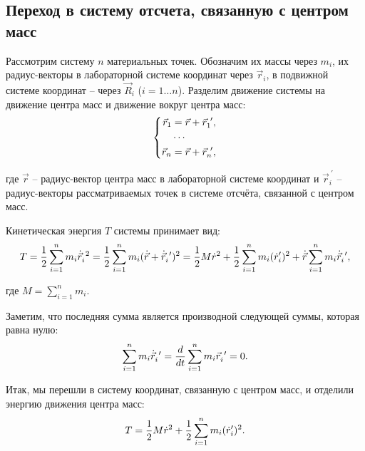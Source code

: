 \documentclass[12pt]{article}
\begin{document}
\subsection{Переход в систему отсчета, связанную с центром масс}

\hspace{0.35cm} Рассмотрим систему $n$ материальных точек. Обозначим их массы через $m_i$, их радиус-векторы в лабораторной системе координат через $\vec{r}_i$, в подвижной системе координат -- через $\vec{R}_i$ ($i = 1 \dots n$). Разделим движение системы на движение центра масс и движение вокруг центра масс:
\vspace*{-0.1cm}
\begin{gather}
\left\{
\begin{aligned}
\vec{r}_1 &= \vec{r} + \vec{r}_1^{\ \prime}, \\
&\cdots \\
\vec{r}_n &= \vec{r} + \vec{r}_n^{\ \prime},
\end{aligned}
\right. \notag
\end{gather}

\hspace*{-0.75cm} где $\vec{r}$ -- радиус-вектор центра масс в лабораторной системе координат и $\vec{r}_i^{\ \prime}$ -- радиус-векторы рассматриваемых точек в системе отсчёта, связанной с центром масс.

Кинетическая энергия $T$ системы принимает вид: 
\vspace*{-0.1cm}
\begin{gather}
T = \frac{1}{2} \sum_{i=1}^{n} m_i \dot{\vec{r}}_i^{\ 2} = \frac{1}{2} \sum_{i=1}^{n} m_i (\dot{\vec{r}} + \dot{\vec{r}}_i^{\ \prime})^2  = \frac{1}{2} M \dot{r}^2 + \frac{1}{2} \sum_{i=1}^{n} m_i ( \dot{r}_i^\prime)^2 + \dot{\vec{r}} \sum_{i=1}^{n} m_i \dot{\vec{r}}_i^{\ \prime}, \notag
\end{gather}

\hspace*{-0.75cm} где $M = \sum_{i=1}^{n} m_i$.

Заметим, что последняя сумма является производной следующей суммы, которая равна нулю: 
\vspace*{-0.1cm}
\begin{gather}
\sum_{i=1}^{n} m_i \dot{\vec{r}}_i^{\ \prime} = \frac{d}{dt} \sum_{i=1}^{n} m_i \vec{r}_i^{\ \prime} = 0. \notag
\end{gather}

Итак, мы перешли в систему координат, связанную с центром масс, и отделили энергию движения центра масс:
\vspace*{-0.1cm}
\begin{gather}
T = \frac{1}{2} M \dot{r}^2 + \frac{1}{2} \sum_{i=1}^{n} m_i( \dot{r}_i^\prime)^2. \notag
\end{gather}
\end{document}
